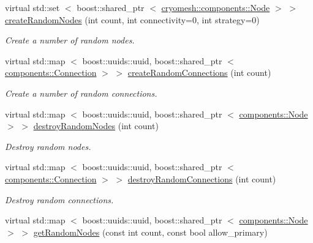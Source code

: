 \begin{DoxyCompactItemize}
\item 
virtual std\-::set\*
$<$ boost\-::shared\-\_\-ptr\*
$<$ \hyperlink{classcryomesh_1_1components_1_1Node}{cryomesh\-::components\-::\-Node} $>$ $>$ \hyperlink{classcryomesh_1_1manipulators_1_1ClusterArchitect_a3f84ac78aebfe6bbe9734db282fec918}{create\-Random\-Nodes} (int count, int connectivity=0, int strategy=0)
\begin{DoxyCompactList}\small\item\em \-Create a number of random nodes. \end{DoxyCompactList}\item 
virtual std\-::map\*
$<$ boost\-::uuids\-::uuid, \*
boost\-::shared\-\_\-ptr\*
$<$ \hyperlink{classcryomesh_1_1components_1_1Connection}{components\-::\-Connection} $>$ $>$ \hyperlink{classcryomesh_1_1manipulators_1_1ClusterArchitect_a022af7cca36ec0477b6729dcea003c0d}{create\-Random\-Connections} (int count)
\begin{DoxyCompactList}\small\item\em \-Create a number of random connections. \end{DoxyCompactList}\item 
virtual std\-::map\*
$<$ boost\-::uuids\-::uuid, \*
boost\-::shared\-\_\-ptr\*
$<$ \hyperlink{classcryomesh_1_1components_1_1Node}{components\-::\-Node} $>$ $>$ \hyperlink{classcryomesh_1_1manipulators_1_1ClusterArchitect_a48390e61b94b0d6bcea14318d9594da9}{destroy\-Random\-Nodes} (int count)
\begin{DoxyCompactList}\small\item\em \-Destroy random nodes. \end{DoxyCompactList}\item 
virtual std\-::map\*
$<$ boost\-::uuids\-::uuid, \*
boost\-::shared\-\_\-ptr\*
$<$ \hyperlink{classcryomesh_1_1components_1_1Connection}{components\-::\-Connection} $>$ $>$ \hyperlink{classcryomesh_1_1manipulators_1_1ClusterArchitect_aa49f0b9d3cad4a8e167cc780f541f9af}{destroy\-Random\-Connections} (int count)
\begin{DoxyCompactList}\small\item\em \-Destroy random connections. \end{DoxyCompactList}\item 
virtual std\-::map\*
$<$ boost\-::uuids\-::uuid, \*
boost\-::shared\-\_\-ptr\*
$<$ \hyperlink{classcryomesh_1_1components_1_1Node}{components\-::\-Node} $>$ $>$ \hyperlink{classcryomesh_1_1manipulators_1_1ClusterArchitect_a6147b7a25140c334898fcae6889a4a4a}{get\-Random\-Nodes} (const int count, const bool allow\-\_\-primary)

\end{DoxyCompactItemize}
